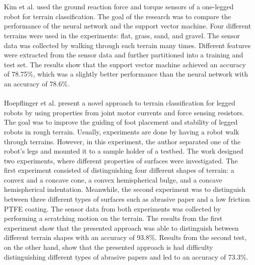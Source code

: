 \documentclass[USenglish]{ifimaster}  %
\begin{document}
\\
\\
Kim et al. \cite{5602459} used the ground reaction force and torque sensors of a one-legged robot for terrain classification. The goal of the research was to compare the performance of the neural network and the support vector machine. Four different terrains were used in the experiments: flat, grass, sand, and gravel. The sensor data was collected by walking through each terrain many times. Different features were extracted from the sensor data and further partitioned into a training and test set. The results show that the support vector machine achieved an accuracy of 78.75\%, which was a slightly better performance than the neural network with an accuracy of 78.6\%.
\\
\\
Hoepflinger et al. \cite{5509309} present a novel approach to terrain classification for legged robots by using properties from joint motor currents and force sensing resistors. The goal was to improve the guiding of foot placement and stability of legged robots in rough terrain. Usually, experiments are done by having a robot walk through terrains. However, in this experiment, the author separated one of the robot’s legs and mounted it to a sample holder of a testbed. The work designed two experiments, where different properties of surfaces were investigated. The first experiment consisted of distinguishing four different shapes of terrain: a convex and a concave cone, a convex hemispherical bulge, and a concave hemispherical indentation. Meanwhile, the second experiment was to distinguish between three different types of surfaces such as abrasive paper and a low friction PTFE coating. The sensor data from both experiments was collected by performing a scratching motion on the terrain. The results from the first experiment show that the presented approach was able to distinguish between different terrain shapes with an accuracy of  93.8\%. Results from the second test, on the other hand, show that the presented approach is had difficulty distinguishing different types of abrasive papers and led to an accuracy of 73.3\%.
 

\end{document}
